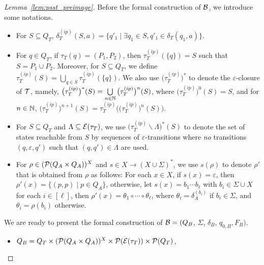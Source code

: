 \begin{proof}[Lemma~\ref{lem:psst_preimage}]
Before the formal construction of $\mathcal{B}$, we introduce some notations.
\begin{itemize}
\item For $S \subseteq Q_T$, $\delta^{(ip)}_T(S, a) = \{q'_1 \mid \exists q_1 \in S, q'_1 \in \delta_T(q_1, a)\}$.
%
\item For $q \in Q_T$,  if $\tau_T(q) = (P_1, P_2)$, then $\tau^{(ip)}_T(\{q\})=S$ such that $S = P_1 \cup P_2$. 
Moreover, for $S \subseteq Q_T$, we define $\tau^{(ip)}_T(S) = \bigcup \limits_{q \in S} \tau^{(ip)}_T(\{q\})$. We also use $\big(\tau^{(ip)}_T\big)^\ast$ to denote the $\varepsilon$-closure of $\mathcal{T}$, namely, $\big(\tau^{(ip)}_T\big)^\ast(S) = \bigcup \limits_{n \in \mathbb{N}} \big(\tau^{(ip)}_T\big)^{n}(S)$, where $\big(\tau^{(ip)}_T\big)^{0}(S) = S$, and for $n \in \mathbb{N}$, $\big(\tau^{(ip)}_T\big)^{n+1}(S) = \tau^{(ip)}_T\big(\big(\tau^{(ip)}_T\big)^{n}(S)\big)$. 
%
\item For $S \subseteq Q_T$ and $\Lambda \subseteq  \mathcal{E}(\tau_T)$, we use $\big(\tau^{(ip)}_T \backslash \Lambda\big)^\ast(S)$ to denote the set of states reachable from $S$ by sequences of $\varepsilon$-transitions where {\it no} transitions $(q, \varepsilon, q')$ such that $(q, q') \in \Lambda$ are used.
%
% 
\item For $\rho \in (\mathcal{P}(Q_A \times Q_A ))^{X}$ and $s \in X \rightarrow (X \cup \Sigma)^{\ast}$, we use $s(\rho)$ to denote $\rho'$ that is obtained from $\rho$ as follows: For each $x \in X$, if $s(x) = \varepsilon$, then $\rho'(x) = \{(p, p) \mid p \in Q_A\}$, otherwise, let $s(x) = b_1 \cdots b_\ell$ with $b_i \in \Sigma \cup X$ for each $i \in [\ell]$, then $\rho'(x) = \theta_1 \circ \cdots \circ \theta_\ell$, where $\theta_i = \delta^{(b_i)}_A$ if $b_i \in \Sigma$, and $\theta_i = \rho(b_i)$ otherwise.
\end{itemize}

We are ready to present the formal construction of $\mathcal{B} =  (Q_B$, $\Sigma$, $\delta_B$, $q_{0, B}, F_B)$. 
\begin{itemize}
\item $Q_B = Q_T \times (\mathcal{P}(Q_A \times Q_A ))^{X} \times \mathcal{P}(\mathcal{E}(\tau_T)) \times \mathcal{P}(Q_T)$, 


\end{itemize}
\end{proof}
